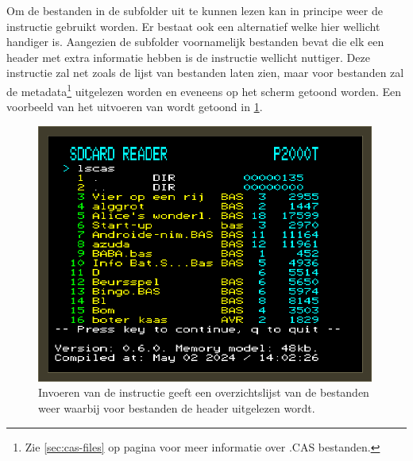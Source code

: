 Om de bestanden in de subfolder  uit te kunnen lezen kan in principe weer de instructie  gebruikt worden. Er bestaat ook een alternatief welke hier wellicht handiger is. Aangezien de subfolder  voornamelijk \cas bestanden bevat die elk een header met extra informatie hebben is de instructie  wellicht nuttiger. Deze instructie zal net zoals  de lijst van bestanden laten zien, maar voor \cas bestanden zal de metadata\footnote{Zie \cref{sec:cas-files} op pagina \pageref{sec:cas-files} voor meer informatie over .CAS bestanden.} uitgelezen worden en eveneens op het scherm getoond worden. Een voorbeeld van het uitvoeren van  wordt getoond in \cref{fig:screenshot-lscas}.

\begin{figure}[h!]
    \centering
    \includegraphics[width=0.99\textwidth]{img/lscas.png}
    \caption{Invoeren van de instructie  geeft een overzichtslijst van de bestanden weer waarbij voor \cas bestanden de header uitgelezen wordt.}
    \label{fig:screenshot-lscas}
\end{figure}

